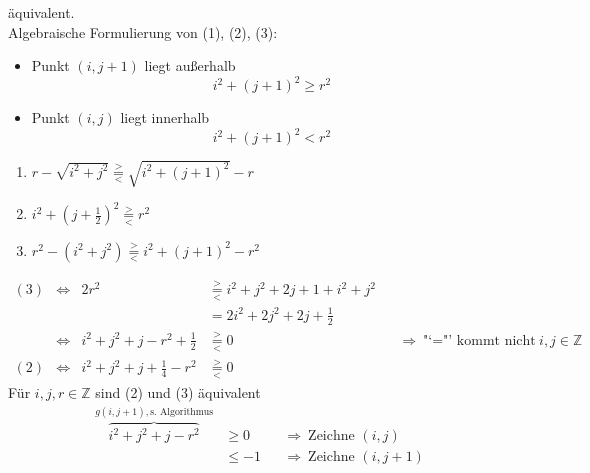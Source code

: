 	äquivalent.\\
	\hrulefill
	Algebraische Formulierung von (1), (2), (3):
	\begin{itemize}
	 \item Punkt $(i,j+1)$ liegt außerhalb
		\[i^2 + (j + 1)^2 \ge r^2\]
	 \item Punkt $(i,j)$ liegt innerhalb
		\[i^2 + (j + 1)^2 < r^2\]
	\end{itemize}
	\newcommand{\glee}{\overset{>}{\underset{<}{=}}}
	\begin{enumerate}
	 \renewcommand*\theenumi{(\arabic{enumi})}
	 \item	$r-\sqrt{i^2+j^2} \glee \sqrt{i^2+(j+1)^2} - r$
	 \item	$i^2 + \left(j+\frac{1}{2}\right)^2 \glee r^2$
	 \item	$r^2 - (i^2 + j^2) \glee i^2+(j+1)^2 - r^2$
	\end{enumerate}
	\begin{align*}
	 (3) &\Longleftrightarrow 	& 2r^2	&\glee i^2 + j^2 + 2j + 1 + i^2 + j^2\\
		&		&	&= 2i^2 + 2j^2 + 2j + \frac{1}{2}\\
	&\Longleftrightarrow	& i^2 + j^2 + j - r^2 + \frac{1}{2} &\glee 0 &&\Rightarrow\
		\text{"`="' kommt nicht vor für $i,j \in \mathbb{Z}$}\\
	 (2) &\Longleftrightarrow	& i^2 + j^2 + j + \frac{1}{4} - r^2 &\glee 0
	\end{align*}
	Für $i, j, r \in \mathbb{Z}$ sind (2) und (3) äquivalent
	\begin{align*}
		\overbrace{i^2 + j^2 + j - r^2}^{g(i,j+1), \text{s. Algorithmus}} &\ge 0 &&\Rightarrow\ \text{Zeichne $(i,j)$}\\
		 &\le -1 &&\Rightarrow\ \text{Zeichne $(i,j+1)$}
	\end{align*}
	
